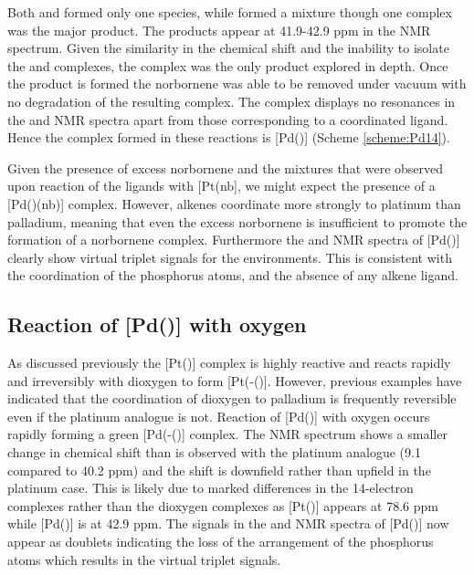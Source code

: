 Both \tButhixantphos{} and \tBusixantphos{} formed only one species, while \tBuxantphos{} formed a mixture though one complex was the major product.  The products appear at 41.9-42.9 ppm in the \phosphorus{} NMR spectrum.  Given the similarity in the \phosphorus{} chemical shift and the inability to isolate the \tBusixantphos{} and \tBuxantphos{} complexes, the \tButhixantphos{} complex was the only product explored in depth.  Once the product is formed the norbornene was able to be removed under vacuum with no degradation of the resulting complex.  The complex displays no resonances in the \proton{} and \carbon{} NMR spectra apart from those corresponding to a coordinated \tButhixantphos{} ligand.  Hence the complex formed in these reactions is [Pd(\tBuxantphos)] (Scheme \ref{scheme:Pd14}).  

Given the presence of excess norbornene and the mixtures that were observed upon reaction of the \tBuxantphos{} ligands with [Pt(nb], we might expect the presence of a [Pd(\tBuxantphos)(nb)] complex.  However, alkenes coordinate more strongly to platinum than palladium, meaning that even the excess norbornene is insufficient to promote the formation of a norbornene complex.  Furthermore the \proton{} and \carbon{} NMR spectra of [Pd(\tButhixantphos)] clearly show virtual triplet signals for the \tBu{} environments.  This is consistent with the \trans{} coordination of the phosphorus atoms, and the absence of any alkene ligand.  

\subsection{Reaction of [Pd(\tButhixantphos)] with oxygen}

As discussed previously the [Pt(\tButhixantphos)] complex is highly reactive and reacts rapidly and irreversibly with dioxygen to form [Pt(\hapto{}-(\tButhixantphos)].  However, previous examples  have indicated that the coordination of dioxygen to palladium is frequently reversible even if the platinum analogue is not.\cite{Yoshida1979}  Reaction of [Pd(\tButhixantphos)] with oxygen occurs rapidly forming a green [Pd(\hapto{}-(\tButhixantphos)] complex.  The \phosphorus{} NMR spectrum shows a smaller change in chemical shift than is observed with the platinum analogue (9.1 compared to 40.2 ppm) and the shift is downfield rather than upfield in the platinum case.  This is likely due to marked differences in the 14-electron complexes rather than the dioxygen complexes as [Pt(\tButhixantphos)] appears at 78.6 ppm while [Pd(\tButhixantphos)] is at 42.9 ppm.  The \tBu{} signals in the \proton{} and \carbon{} NMR spectra of [Pd(\tButhixantphos)] now appear as doublets indicating the loss of the \trans{} arrangement of the phosphorus atoms which results in the virtual triplet signals.  

